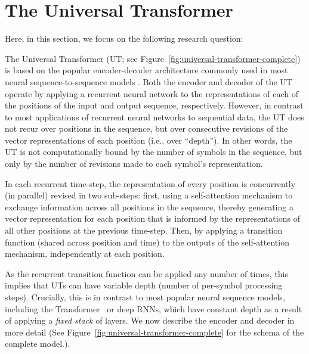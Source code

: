 \section{The Universal Transformer }%
Here, in this section, we focus on the following research question:

The Universal Transformer (UT; see Figure~\ref{fig:universal-transformer-complete}) is based on the popular encoder-decoder architecture commonly used in most neural sequence-to-sequence models \citep{sutskever14,cho2014learning,transformer}. Both the encoder and decoder of the UT operate by applying a recurrent neural network to the representations of each of the positions of the input and output sequence, respectively. However, in contrast to most applications of recurrent neural networks to sequential data, the UT does not recur over positions in the sequence, but over consecutive revisions of the vector representations of each position (i.e., over ``depth''). In other words, the UT is not computationally bound by the number of symbols in the sequence, but only by the number of revisions made to each symbol's representation.

In each recurrent time-step, the representation of every position is concurrently (in parallel) revised in two sub-steps: first, using a self-attention mechanism to exchange information across all positions in the sequence, thereby generating a vector representation for each position that is informed by the representations of all other positions at the previous time-step. Then, by applying a transition function (shared across position and time) to the outputs of the self-attention mechanism, independently at each position. 

As the recurrent transition function can be applied any number of times, this implies that UTs can have variable depth (number of per-symbol processing steps). Crucially, this is in contrast to most popular neural sequence models, including the Transformer~\citep{transformer} or deep RNNs, which have constant depth as a result of applying a \emph{fixed stack} of layers.  We now describe the encoder and decoder in more detail (See Figure~\ref{fig:universal-transformer-complete} for the schema of the complete model.).

